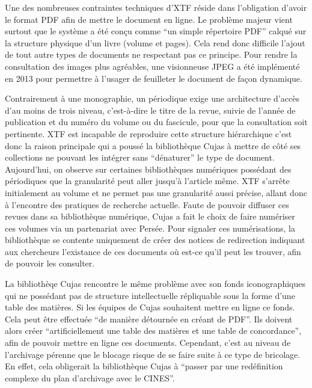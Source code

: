 Une des nombreuses contraintes techniques d'XTF réside dans l'obligation d'avoir le format PDF afin de mettre le document en ligne. Le problème majeur vient surtout que le système a été conçu comme \enquote{un simple répertoire PDF} calqué sur la structure physique d'un livre (volume et pages). Cela rend donc difficile l'ajout de tout autre types de documents ne respectant pas ce principe. Pour rendre la consultation des images plus agréables, une visionneuse JPEG a été implémenté en 2013 pour permettre à l'usager de feuilleter le document de façon dynamique. 

Contrairement à une monographie, un périodique exige une architecture d'accès d'au moins de trois niveau, c'est-à-dire le titre de la revue, suivie de l'année de publication et du numéro du volume ou du fascicule, pour que la consultation soit pertinente. XTF est incapable de reproduire cette structure hiérarchique c'est donc la raison principale qui a poussé la bibliothèque Cujas à mettre de côté ses collections ne pouvant les intégrer sans \enquote{dénaturer} le type de document. Aujourd'hui, on observe sur certaines bibliothèques numériques possédant des périodiques que la granularité peut aller jusqu'à l'article même. XTF s'arrête initialement au volume et ne permet pas une granularité aussi précise, allant donc à l'encontre des pratiques de recherche actuelle. Faute de pouvoir diffuser ces revues dans sa bibliothèque numérique, Cujas a fait le choix de faire numériser ces volumes via un partenariat avec Persée. Pour signaler ces numérisations, la bibliothèque se contente uniquement de créer des notices de redirection indiquant aux chercheurs l'existance de ces documents où est-ce qu'il peut les trouver, afin de pouvoir les consulter. 

La bibliothèqe Cujas rencontre le même problème avec son fonds iconographiques qui ne possédant pas de structure intellectuelle répliquable sous la forme d'une table des matières. Si les équipes de Cujas souhaitent mettre en ligne ce fonds. Cela peut être effectuée \enquote{de manière détournée en créant de PDF}. Ils doivent alors créer \enquote{artificiellement une table des matières et une table de concordance}, afin de pouvoir mettre en ligne ces documents. Cependant, c'est au niveau de l'archivage pérenne que le blocage risque de se faire suite à ce type de bricolage. En effet, cela obligerait la bibliothèque Cujas à \enquote{passer par une redéfinition complexe du plan d'archivage avec le CINES}. 

